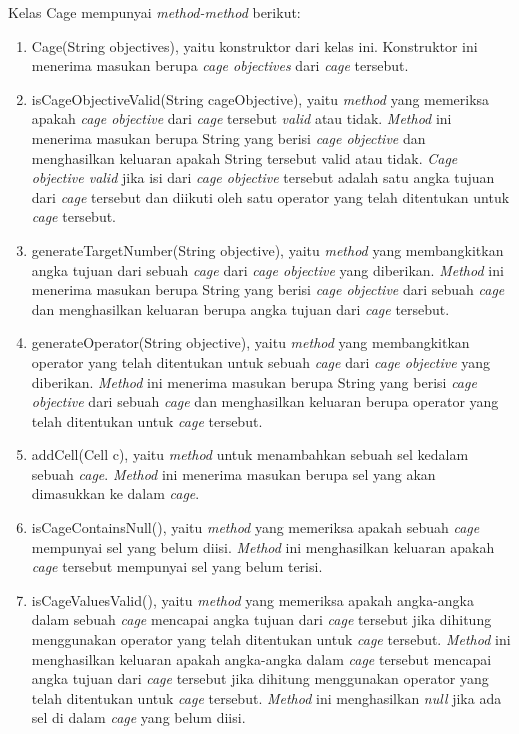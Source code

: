 Kelas Cage mempunyai \textit{method-method} berikut:

\begin{enumerate}
\item Cage(String objectives), yaitu konstruktor dari kelas ini. Konstruktor ini menerima masukan berupa \textit{cage objectives} dari \textit{cage} tersebut.
\item isCageObjectiveValid(String cageObjective), yaitu \textit{method} yang memeriksa apakah \textit{cage objective} dari \textit{cage} tersebut \textit{valid} atau tidak. \textit{Method} ini menerima masukan berupa String yang berisi \textit{cage objective} dan menghasilkan keluaran apakah String tersebut valid atau tidak. \textit{Cage objective valid} jika isi dari \textit{cage objective} tersebut adalah satu angka tujuan dari \textit{cage} tersebut dan diikuti oleh satu operator yang telah ditentukan untuk \textit{cage} tersebut.
\item generateTargetNumber(String objective), yaitu \textit{method} yang membangkitkan angka tujuan dari sebuah \textit{cage} dari \textit{cage objective} yang diberikan. \textit{Method} ini menerima masukan berupa String yang berisi \textit{cage objective} dari sebuah \textit{cage} dan menghasilkan keluaran berupa angka tujuan dari \textit{cage} tersebut.
\item generateOperator(String objective), yaitu \textit{method} yang membangkitkan operator yang telah ditentukan untuk sebuah \textit{cage} dari \textit{cage objective} yang diberikan. \textit{Method} ini menerima masukan berupa String yang berisi \textit{cage objective} dari sebuah \textit{cage} dan menghasilkan keluaran berupa operator yang telah ditentukan untuk \textit{cage} tersebut.
\item addCell(Cell c), yaitu \textit{method} untuk menambahkan sebuah sel kedalam sebuah \textit{cage}. \textit{Method} ini menerima masukan berupa sel yang akan dimasukkan ke dalam \textit{cage}.
\item isCageContainsNull(), yaitu \textit{method} yang memeriksa apakah sebuah \textit{cage} mempunyai sel yang belum diisi. \textit{Method} ini menghasilkan keluaran apakah \textit{cage} tersebut mempunyai sel yang belum terisi.
\item isCageValuesValid(), yaitu \textit{method} yang memeriksa apakah angka-angka dalam sebuah \textit{cage} mencapai angka tujuan dari \textit{cage} tersebut jika dihitung menggunakan operator yang telah ditentukan untuk \textit{cage} tersebut. \textit{Method} ini menghasilkan keluaran apakah angka-angka dalam \textit{cage} tersebut mencapai angka tujuan dari \textit{cage} tersebut jika dihitung menggunakan operator yang telah ditentukan untuk \textit{cage} tersebut. \textit{Method} ini menghasilkan \textit{null} jika ada sel di dalam \textit{cage} yang belum diisi.

\end{enumerate}
